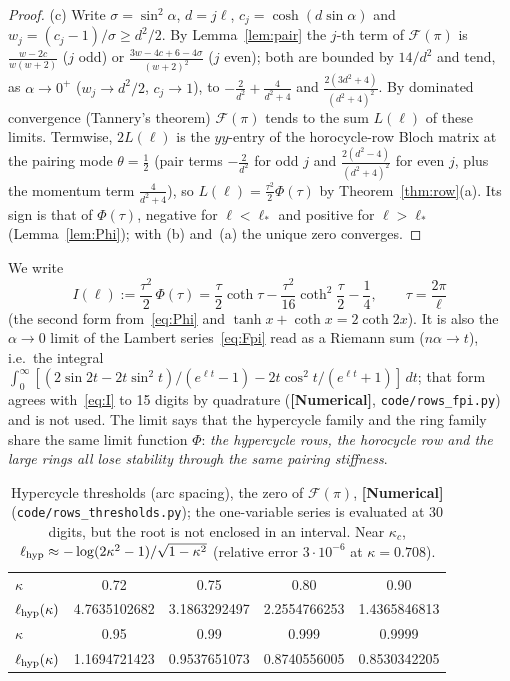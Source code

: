 \documentclass[11pt]{article}
\theoremstyle{definition}
\theoremstyle{remark}
\newcommand{\st}[1]{\textbf{[#1]}}
\begin{document}
\begin{proof}
(c) Write $\sigma=\sin^2\alpha$, $d=j\ell$, $c_j=\cosh(d\sin\alpha)$ and $w_j=(c_j-1)/\sigma\ge d^2/2$. By Lemma~\ref{lem:pair} the $j$-th term of
$\mathcal F(\pi)$ is $\frac{w-2c}{w(w+2)}$ ($j$ odd) or $\frac{3w-4c+6-4\sigma}{(w+2)^2}$ ($j$ even); both are bounded by $14/d^2$ and tend,
as $\alpha\to0^+$ ($w_j\to d^2/2$, $c_j\to1$), to $-\frac2{d^2}+\frac4{d^2+4}$ and $\frac{2(3d^2+4)}{(d^2+4)^2}$. By dominated convergence
(Tannery's theorem) $\mathcal F(\pi)$ tends to the sum $L(\ell)$ of these limits. Termwise, $2L(\ell)$ is the $yy$-entry of the
horocycle-row Bloch matrix at the pairing mode $\theta=\frac12$ (pair terms $-\frac2{d^2}$ for odd $j$ and $\frac{2(d^2-4)}{(d^2+4)^2}$ for even
$j$, plus the momentum term $\frac4{d^2+4}$), so $L(\ell)=\frac{\tau^2}2\Phi(\tau)$ by Theorem~\ref{thm:row}(a). Its sign is that of
$\Phi(\tau)$, negative for $\ell<\ell_*$ and positive for $\ell>\ell_*$ (Lemma~\ref{lem:Phi}); with (b) and~(a) the unique zero converges.
\end{proof}
We write
\begin{equation}\label{eq:I}
I(\ell):=\frac{\tau^2}2\,\Phi(\tau)=\frac\tau2\coth\tau-\frac{\tau^2}{16}\coth^2\frac\tau2-\frac14,\qquad\tau=\frac{2\pi}\ell
\end{equation}
(the second form from~\eqref{eq:Phi} and $\tanh x+\coth x=2\coth2x$). It is also the $\alpha\to0$ limit of the Lambert
series~\eqref{eq:Fpi} read as a Riemann sum ($n\alpha\to t$), i.e.\ the integral
$\int_0^\infty[(2\sin2t-2t\sin^2t)/(e^{\ell t}-1)-2t\cos^2t/(e^{\ell t}+1)]\,dt$; that form agrees with~\eqref{eq:I} to 15 digits by
quadrature (\st{Numerical}, \nolinkurl{code/rows_fpi.py}) and is not used. The limit says that the hypercycle family and the ring family share the same limit
function $\Phi$: \emph{the hypercycle rows, the horocycle row and the large rings all lose stability through the same pairing
stiffness}.

\begin{table}[ht]\centering\small
\begin{tabular}{lcccc}\toprule
$\kappa$ & 0.72 & 0.75 & 0.80 & 0.90\\
$\ell_{\rm hyp}(\kappa)$ & 4.7635102682 & 3.1863292497 & 2.2554766253 & 1.4365846813\\\midrule
$\kappa$ & 0.95 & 0.99 & 0.999 & 0.9999\\
$\ell_{\rm hyp}(\kappa)$ & 1.1694721423 & 0.9537651073 & 0.8740556005 & 0.8530342205\\\bottomrule
\end{tabular}
\caption{Hypercycle thresholds (arc spacing), the zero of $\mathcal F(\pi)$, \st{Numerical} (\nolinkurl{code/rows_thresholds.py}); the one-variable
series is evaluated at 30 digits, but the root is not enclosed in an interval. Near $\kappa_c$,
$\ell_{\rm hyp}\approx-\log(2\kappa^2-1)/\sqrt{1-\kappa^2}$ (relative error $3\cdot10^{-6}$ at $\kappa=0.708$).}\label{tab:hyper}
\end{table}
\end{document}
